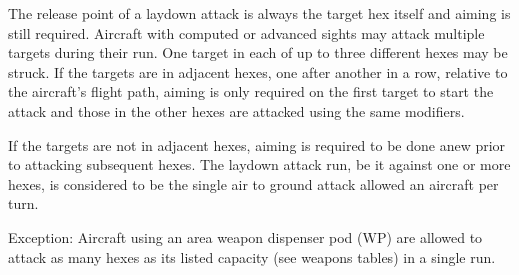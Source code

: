 The release point of a laydown attack is always the target hex itself and aiming is still required.  Aircraft with computed or advanced sights may attack multiple targets during their run. One target in each of up to three different hexes may be struck.  If the targets are in adjacent hexes, one after another in a row, relative to the aircraft's flight path, aiming is only required on the first target to start the attack and those in the other hexes are attacked using the same modifiers.

If the targets are not in adjacent hexes, aiming is required to be done anew prior to attacking subsequent hexes. The laydown attack run, be it against one or more hexes, is considered to be the single air to ground attack allowed an aircraft per turn.

Exception: Aircraft using an area weapon dispenser pod (WP) are allowed to attack as many hexes as its listed capacity (see weapons tables) in a single run.

